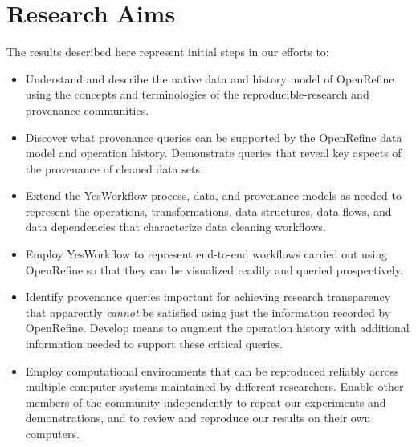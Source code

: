\section{Research Aims}

The results described here represent initial steps in our efforts to:

\begin{itemize}[label=\raisebox{0.25ex}{\tiny$\bullet$}]

\item Understand and describe the native data and history model of OpenRefine using the concepts and terminologies of the reproducible-research and provenance communities.

\item Discover what provenance queries can be supported by the OpenRefine data model and operation history.  Demonstrate queries that reveal key aspects of the provenance of cleaned data sets.

\item Extend the YesWorkflow process, data, and provenance models as needed to represent the operations, transformations, data structures, data flows, and data dependencies that characterize data cleaning workflows.  

\item Employ YesWorkflow to represent end-to-end workflows carried out using OpenRefine so that they can be visualized readily and queried prospectively.

\item Identify provenance queries important for achieving research transparency that apparently \emph{cannot} be satisfied using just the information recorded by OpenRefine. Develop means to augment the operation history with additional information needed to support these critical queries.

\item Employ computational environments that can be reproduced reliably across multiple computer systems maintained by different researchers. Enable other members of the community independently to repeat our experiments and demonstrations, and to review and reproduce our results on their own computers.

\end{itemize}
